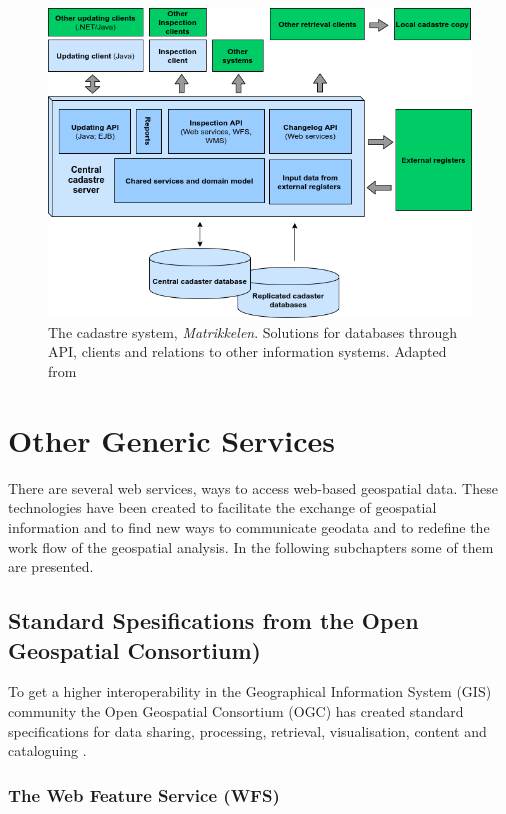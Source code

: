 \begin{figure}[H]
	\centering
	\includegraphics[scale=0.5]{img/matrikkelSYS}
	\caption{The cadastre system, \textit{Matrikkelen}. Solutions for databases through API, clients and relations to other information systems. Adapted from \citep[p.~337]{Matrikkelavdelingen2017} }
	\label{fig:matr}
\end{figure}

\section{Other Generic Services}
There are several web services, ways to access web-based geospatial data. These technologies have been created to facilitate the exchange of geospatial information and to find new ways to communicate geodata and to redefine the work flow of the geospatial analysis. In the following subchapters some of them are presented.  

\subsection{Standard Spesifications from the Open Geospatial Consortium)}\label{OGC}
To get a higher interoperability in the Geographical Information System (GIS) community the Open Geospatial Consortium (OGC) has created standard specifications for data sharing, processing, retrieval, visualisation, content and cataloguing \citep{giuliani2013}.

\subsubsection{The Web Feature Service (WFS)}\label{wfs}

